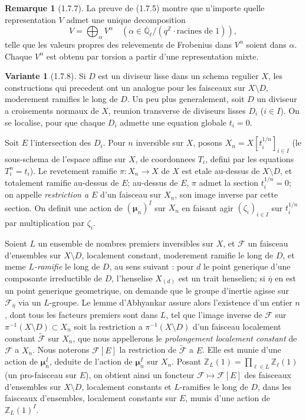 \documentclass[12pt,a4paper]{article}
\theoremstyle{plain}
\theoremstyle{definition}
\newtheorem{remarque}[theorem]{Remarque}
\newtheorem{var}[theorem]{Variante}
\theoremstyle{definition}
\theoremstyle{remark}
\begin{document}
\begin{remarque}[1.7.7]
La preuve de (1.7.5) montre que n'importe quelle representation $V$ admet une unique decomposition
\[V = \bigoplus_\alpha V^\alpha \quad (\alpha \in \overline{\mathbb{Q}}_\ell / (q^\mathbb{Z} \cdot \text{racines de } 1)),\]
telle que les valeurs propres des relevements de Frobenius dans $V^\alpha$ soient dans $\alpha$. Chaque $V^\alpha$ est obtenu par torsion a partir d'une representation mixte.
\end{remarque}

\begin{var}[1.7.8]
Si $D$ est un diviseur lisse dans un schema regulier $X$, les constructions qui precedent ont un analogue pour les faisceaux sur $X \setminus D$, moderement ramifies le long de $D$. Un peu plus generalement, soit $D$ un diviseur a croisements normaux de $X$, reunion transverse de diviseurs lisses $D_i$ ($i \in I$). On se localise, pour que chaque $D_i$ admette une equation globale $t_i = 0$.

Soit $E$ l'intersection des $D_i$. Pour $n$ inversible sur $X$, posons $X_n = X[t_i^{1/n}]_{i \in I}$ (le sous-schema de l'espace affine sur $X$, de coordonnees $T_i$, defini par les equations $T_i^n = t_i$). Le revetement ramifie $\pi: X_n \to X$ de $X$ est etale au-dessus de $X \setminus D$, et totalement ramifie au-dessus de $E$; au-dessus de $E$, $\pi$ admet la section $t_i^{1/n} = 0$; on appelle \emph{restriction a $E$} d'un faisceau sur $X_n$, son image inverse par cette section. On definit une action de $(\boldsymbol{\mu}_n)^I$ sur $X_n$ en faisant agir $(\zeta_i)_{i \in I}$ sur $t_i^{1/n}$ par multiplication par $\zeta_i$.

Soient $L$ un ensemble de nombres premiers inversibles sur $X$, et $\mathscr{F}$ un faisceau d'ensembles sur $X \setminus D$, localement constant, moderement ramifie le long de $D$, et meme $L$\emph{-ramifie} le long de $D$, au sens suivant : pour $d$ le point generique d'une composante irreductible de $D$, l'henselise $X_{(d)}$ est un trait henselien; si $\overline{\eta}$ en est un point generique geometrique, on demande que le groupe d'inertie agisse sur $\mathscr{F}_{\overline{\eta}}$ via un $L$-groupe. Le lemme d'Abhyankar assure alors l'existence d'un entier $n$, dont tous les facteurs premiers sont dans $L$, tel que l'image inverse de $\mathscr{F}$ sur $\pi^{-1}(X \setminus D) \subset X_n$ soit la restriction a $\pi^{-1}(X \setminus D)$ d'un faisceau localement constant $\widetilde{\mathscr{F}}$ sur $X_n$, que nous appellerons le \emph{prolongement localement constant} de $\mathscr{F}$ a $X_n$. Nous noterons $\mathscr{F}[E]$ la restriction de $\widetilde{\mathscr{F}}$ a $E$. Elle est munie d'une action de $\boldsymbol{\mu}_n^I$, deduite de l'action de $\boldsymbol{\mu}_n^I$ sur $X_n$. Posant $\mathbb{Z}_L(1) = \prod_{\ell \in L} \mathbb{Z}_\ell(1)$ (un pro-faisceau sur $E$), on obtient ainsi un foncteur $\mathscr{F} \mapsto \mathscr{F}[E]$ des faisceaux d'ensembles sur $X \setminus D$, localement constants et $L$-ramifies le long de $D$, dans les faisceaux d'ensembles, localement constants sur $E$, munis d'une action de $\mathbb{Z}_L(1)^I$.


\end{var}
\end{document}

